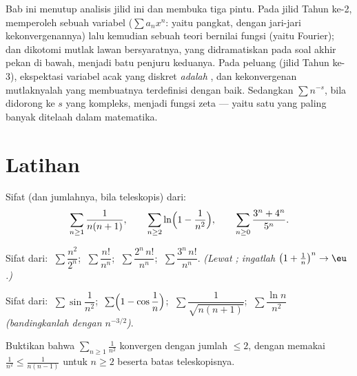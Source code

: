 \begin{remark}
Bab ini menutup analisis jilid ini dan membuka tiga
pintu. Pada jilid Tahun ke-2,  memperoleh sebuah variabel ($\sum
a_n x^n$: yaitu  pangkat, dengan jari-jari kekonvergenannya) lalu
kemudian sebuah teori bernilai fungsi (yaitu  Fourier); dan dikotomi
mutlak lawan bersyaratnya, yang didramatiskan pada
soal akhir pekan di bawah, menjadi batu penjuru keduanya. Pada
peluang (jilid Tahun ke-3), ekspektasi variabel acak yang
diskret \emph{adalah} , dan kekonvergenan mutlaknyalah yang
membuatnya terdefinisi dengan baik. Sedangkan  $\sum n^{-s}$,
bila didorong ke $s$ yang kompleks, menjadi fungsi zeta --- yaitu satu
 yang paling banyak ditelaah dalam matematika.
\end{remark}

\section{Latihan}

\begin{exercise}[$\star$]\label{exo:b1:series:1}
Sifat (dan jumlahnya, bila teleskopis) dari:
\[
\sum_{n\geq1} \frac{1}{n(n+1)},
\qquad
\sum_{n\geq2} \ln\Bigl(1 - \frac{1}{n^2}\Bigr),
\qquad
\sum_{n\geq0} \frac{3^n + 4^n}{5^n} .
\]
\end{exercise}

\begin{exercise}[$\star$]\label{exo:b1:series:2}
Sifat dari: $\;\sum \dfrac{n^2}{2^n}$; $\;\sum \dfrac{n!}{n^n}$;
$\;\sum \dfrac{2^n\,n!}{n^n}$; $\;\sum \dfrac{3^n\,n!}{n^n}$.
\emph{(Lewat ; ingatlah $\bigl(1 + \frac1n\bigr)^n \to \eu$.)}
\end{exercise}

\begin{exercise}[$\star$]\label{exo:b1:series:3}
Sifat dari: $\;\sum \sin\dfrac{1}{n^2}$; $\;\sum
\Bigl(1 - \cos\dfrac1n\Bigr)$; $\;\sum \dfrac{1}{\sqrt{n(n+1)}}$;
$\;\sum \dfrac{\ln n}{n^2}$ \emph{(bandingkanlah dengan $n^{-3/2}$)}.
\end{exercise}

\begin{exercise}[$\star$]\label{exo:b1:series:4}
Buktikan bahwa $\sum_{n\geq1} \frac{1}{n^2}$ konvergen dengan jumlah $\leq 2$,
dengan memakai $\frac{1}{n^2} \leq \frac{1}{n(n-1)}$ untuk $n \geq 2$ beserta batas
teleskopisnya.
\end{exercise}

